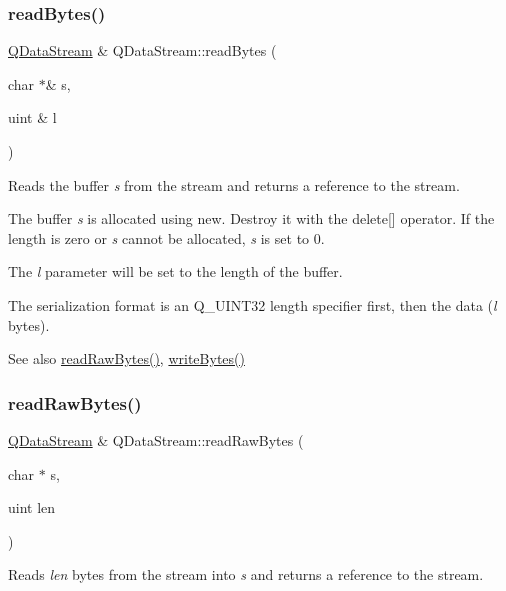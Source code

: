 \subsubsection{\texorpdfstring{readBytes()}{readBytes()}}
{\footnotesize\ttfamily \mbox{\hyperlink{class_q_data_stream}{Q\+Data\+Stream}} \& Q\+Data\+Stream\+::read\+Bytes (\begin{DoxyParamCaption}\item[{char $\ast$\&}]{s,  }\item[{uint \&}]{l }\end{DoxyParamCaption})}

Reads the buffer {\itshape s} from the stream and returns a reference to the stream.

The buffer {\itshape s} is allocated using {\ttfamily new}. Destroy it with the {\ttfamily delete}\mbox{[}\mbox{]} operator. If the length is zero or {\itshape s} cannot be allocated, {\itshape s} is set to 0.

The {\itshape l} parameter will be set to the length of the buffer.

The serialization format is an Q\+\_\+\+U\+I\+N\+T32 length specifier first, then the data ({\itshape l} bytes).

\begin{DoxySeeAlso}{See also}
\mbox{\hyperlink{class_q_data_stream_a04938bc54d1158276cf01be169d159ea}{read\+Raw\+Bytes()}}, \mbox{\hyperlink{class_q_data_stream_a8f1af77d483ecfd515c9eac3822aaaa5}{write\+Bytes()}} 
\end{DoxySeeAlso}
\mbox{\label{class_q_data_stream_a04938bc54d1158276cf01be169d159ea}} 
\subsubsection{\texorpdfstring{readRawBytes()}{readRawBytes()}}
{\footnotesize\ttfamily \mbox{\hyperlink{class_q_data_stream}{Q\+Data\+Stream}} \& Q\+Data\+Stream\+::read\+Raw\+Bytes (\begin{DoxyParamCaption}\item[{char $\ast$}]{s,  }\item[{uint}]{len }\end{DoxyParamCaption})}

Reads {\itshape len} bytes from the stream into {\itshape s} and returns a reference to the stream.

